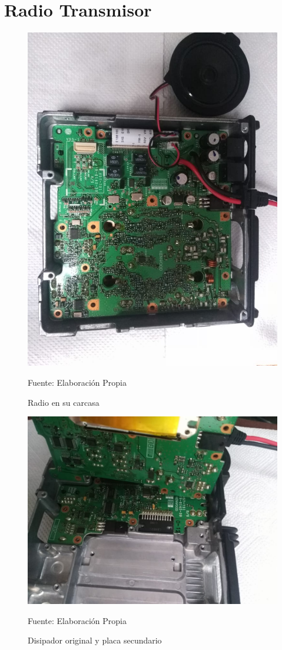 \chapter{Radio Transmisor}

\begin{figure}[H]
\centering
\includegraphics[scale=0.3]{Figuras/Radio_1.jpeg}
\caption{Radio en su carcasa}
Fuente: Elaboración Propia
\label{anexo16}
\end{figure}

\begin{figure}[H]
\centering
\includegraphics[scale=0.3]{Figuras/Radio_2.jpeg}
\caption{Disipador original y placa secundario}
Fuente: Elaboración Propia
\label{anexo17}
\end{figure}

